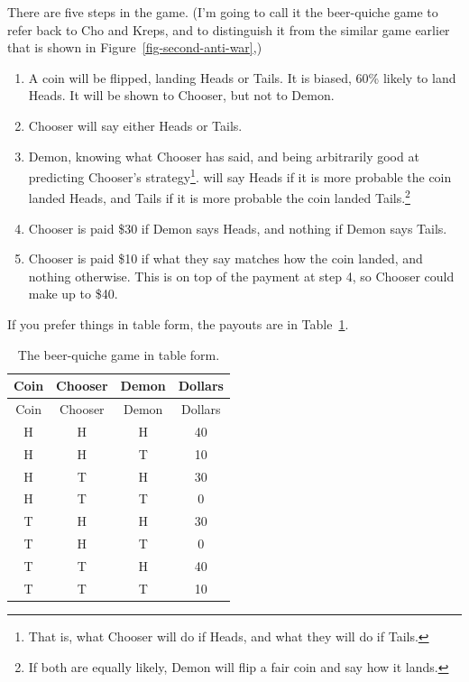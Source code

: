 \documentclass[
  12pt,
  letterpaper,
  DIV=11,
  numbers=noendperiod]{scrreprt}
\providecommand{\tightlist}{%
  \setlength{\itemsep}{0pt}\setlength{\parskip}{0pt}}\usepackage{longtable,booktabs,array}
\begin{document}
There are five steps in the game. (I'm going to call it the beer-quiche
game to refer back to Cho and Kreps, and to distinguish it from the
similar game earlier that is shown in Figure~\ref{fig-second-anti-war},)

\begin{enumerate}
\def\labelenumi{\arabic{enumi}.}
\tightlist
\item
  A coin will be flipped, landing Heads or Tails. It is biased, 60\%
  likely to land Heads. It will be shown to Chooser, but not to Demon.
\item
  Chooser will say either Heads or Tails.
\item
  Demon, knowing what Chooser has said, and being arbitrarily good at
  predicting Chooser's strategy\footnote{That is, what Chooser will do
    if Heads, and what they will do if Tails.}. will say Heads if it is
  more probable the coin landed Heads, and Tails if it is more probable
  the coin landed Tails.\footnote{If both are equally likely, Demon will
    flip a fair coin and say how it lands.}
\item
  Chooser is paid \$30 if Demon says Heads, and nothing if Demon says
  Tails.
\item
  Chooser is paid \$10 if what they say matches how the coin landed, and
  nothing otherwise. This is on top of the payment at step 4, so Chooser
  could make up to \$40.
\end{enumerate}

If you prefer things in table form, the payouts are in
Table~\ref{tbl-cho-kreps}.

\begin{longtable}[]{@{}cccc@{}}
\caption{The beer-quiche game in table
form.}\label{tbl-cho-kreps}\tabularnewline
\toprule\noalign{}
Coin & Chooser & Demon & Dollars \\
\midrule\noalign{}
\endfirsthead
\toprule\noalign{}
Coin & Chooser & Demon & Dollars \\
\midrule\noalign{}
\endhead
\bottomrule\noalign{}
\endlastfoot
H & H & H & 40 \\
H & H & T & 10 \\
H & T & H & 30 \\
H & T & T & 0 \\
T & H & H & 30 \\
T & H & T & 0 \\
T & T & H & 40 \\
T & T & T & 10 \\
\end{longtable}
\end{document}

